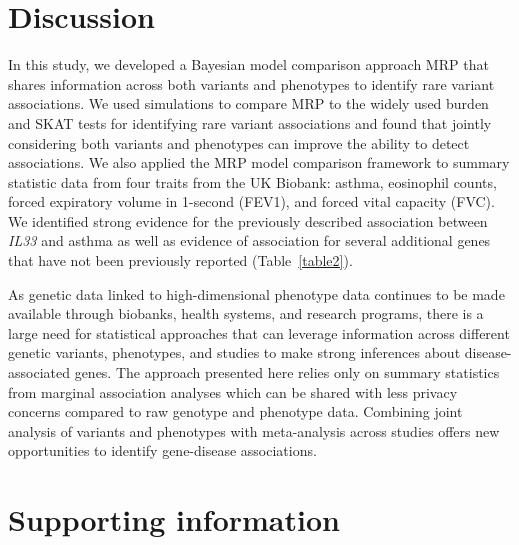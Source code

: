\section*{Discussion}
In this study, we developed a Bayesian model comparison approach MRP that shares information across both variants and phenotypes to identify rare variant associations. We used simulations to compare MRP to the widely used burden and SKAT tests for identifying rare variant associations and found that jointly considering both variants and phenotypes can improve the ability to detect associations. We also applied the MRP model comparison framework to summary statistic data from four traits from the UK Biobank: asthma, eosinophil counts, forced expiratory volume in 1-second (FEV1), and forced vital capacity (FVC). We identified strong evidence for the previously described association between \textit{IL33} and asthma\cite{DeBoever179762, 10.1371/journal.pgen.1006659} as well as evidence of association for several additional genes that have not been previously reported (Table~\ref{table2}). 

As genetic data linked to high-dimensional phenotype data continues to be made available through biobanks, health systems, and research programs, there is a large need for statistical approaches that can leverage information across different genetic variants, phenotypes, and studies to make strong inferences about disease-associated genes. The approach presented here relies only on summary statistics from marginal association analyses which can be shared with less privacy concerns compared to raw genotype and phenotype data. Combining joint analysis of variants and phenotypes with meta-analysis across studies offers new opportunities to identify gene-disease associations.



\section*{Supporting information}

